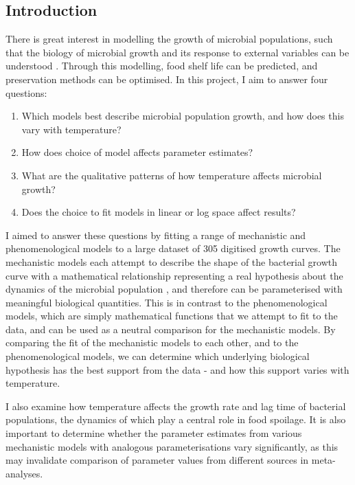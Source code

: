 \documentclass[11pt, a4paper]{article}
\begin{document}
\begin{linenumbers}
    \section{Introduction}
    
    There is great interest in modelling the growth of microbial populations, such that the biology of microbial growth and its response to external variables can be understood \cite{zwitmodelling}. Through this modelling, food shelf life can be predicted, and preservation methods can be optimised. In this project, I aim to answer four questions:    
      


\begin{enumerate}
  \item Which models best describe microbial population growth, and how does this vary with temperature?
  \item How does choice of model affects parameter estimates?
  \item What are the qualitative patterns of how temperature affects microbial growth?
  \item Does the choice to fit models in linear or log space affect results?
  \end{enumerate}


I aimed to answer these questions by fitting a range of mechanistic and phenomenological models to a large dataset of 305 digitised growth curves. The mechanistic models each attempt to describe the shape of the bacterial growth curve with a mathematical relationship representing a real hypothesis about the dynamics of the microbial population \cite{Buchanan}, and therefore can be parameterised with meaningful biological quantities. This is in contrast to the phenomenological models, which are simply mathematical functions that we attempt to fit to the data, and can be used as a neutral comparison for the mechanistic models. By comparing the fit of the mechanistic models to each other, and to the phenomenological models, we can determine which underlying biological hypothesis has the best support from the data - and how this support varies with temperature.

I also examine how temperature affects the growth rate and lag time of bacterial populations, the dynamics of which play a central role in food spoilage. It is also important to determine whether the parameter estimates from various mechanistic models with analogous parameterisations vary significantly, as this may invalidate comparison of parameter values from different sources in meta-analyses.


\end{linenumbers}
\end{document}
